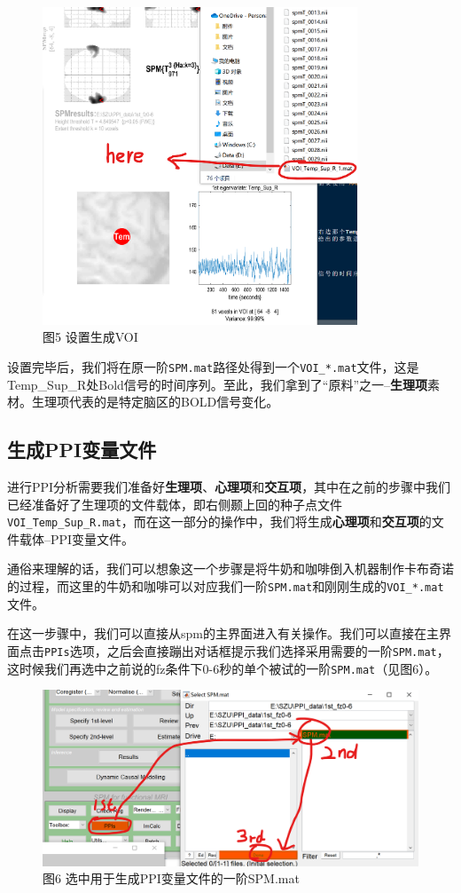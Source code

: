 \documentclass[
]{article}
\begin{document}
\begin{figure}
\centering
\includegraphics[width=3.69792in,height=\textheight]{get_VOI.png}
\caption{图5 设置生成VOI}
\end{figure}

设置完毕后，我们将在原一阶\texttt{SPM.mat}路径处得到一个\texttt{VOI\_*.mat}文件，这是Temp\_Sup\_R处Bold信号的时间序列。至此，我们拿到了``原料''之一--\textbf{生理项}素材。生理项代表的是特定脑区的BOLD信号变化。

\hypertarget{ux751fux6210ppiux53d8ux91cfux6587ux4ef6}{%
\subsection{生成PPI变量文件}\label{ux751fux6210ppiux53d8ux91cfux6587ux4ef6}}

进行PPI分析需要我们准备好\textbf{生理项}、\textbf{心理项}和\textbf{交互项}，其中在之前的步骤中我们已经准备好了生理项的文件载体，即右侧颞上回的种子点文件\texttt{VOI\_Temp\_Sup\_R.mat}，而在这一部分的操作中，我们将生成\textbf{心理项}和\textbf{交互项}的文件载体--PPI变量文件。

通俗来理解的话，我们可以想象这一个步骤是将牛奶和咖啡倒入机器制作卡布奇诺的过程，而这里的牛奶和咖啡可以对应我们一阶\texttt{SPM.mat}和刚刚生成的\texttt{VOI\_*.mat}文件。

在这一步骤中，我们可以直接从spm的主界面进入有关操作。我们可以直接在主界面点击\texttt{PPIs}选项，之后会直接蹦出对话框提示我们选择采用需要的一阶\texttt{SPM.mat}，这时候我们再选中之前说的fz条件下0-6秒的单个被试的一阶\texttt{SPM.mat}（见图6）。

\begin{figure}
\centering
\includegraphics[width=4.47917in,height=\textheight]{PPIs_step1.png}
\caption{图6 选中用于生成PPI变量文件的一阶SPM.mat}
\end{figure}
\end{document}
